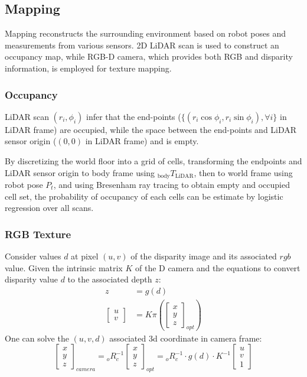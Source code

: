\documentclass[conference]{IEEEtran}
\begin{document}
\subsection{Mapping}
Mapping reconstructs the surrounding environment based on robot poses and measurements from various sensors.
2D LiDAR scan is used to construct an occupancy map, 
while RGB-D camera, which provides both RGB and disparity information,
is employed for texture mapping.

\subsubsection{Occupancy}
LiDAR scan $(r_i, \phi_i)$ infer that 
the end-points ($\{(r_i\cos\phi_i, r_i\sin\phi_i), \forall i\}$ in LiDAR frame) are occupied,
while the space between the end-points and LiDAR sensor origin 
($(0, 0)$ in LiDAR frame) and is empty.

By discretizing the world floor into a grid of cells,
transforming the endpoints and LiDAR sensor origin to body frame using $_{\text{body}}T_{\text{LiDAR}}$, 
then to world frame using robot pose $P_t$,
and using Bresenham ray tracing to obtain empty and occupied cell set,
the probability of occupancy of each cells can be estimate by
logistic regression over all scans.

\subsubsection{RGB Texture}
Consider values $d$ at pixel $(u, v)$ of the disparity image 
and its associated $rgb$ value.
Given the intrinsic matrix $K$ of the D camera and
the equations to convert disparity value $d$ to the associated depth $z$:
$$
\begin{aligned}
    z&=g(d)\\ 
    \left[ \begin{gathered}u\\ v\end{gathered} \right]  &=K\pi \left( \left[ \begin{gathered}x\\ y\\ z\end{gathered} \right]_{opt}  \right)  
\end{aligned}
$$
One can solve the $(u, v, d)$ associated 3d coordinate in camera frame:
$$
\left[ \begin{gathered}x\\ y\\ z\end{gathered} \right]_{camera}
= {}_oR_c^{-1}  \left[ \begin{gathered}x\\ y\\ z\end{gathered} \right]_{opt}  
= {}_oR_c^{-1} \cdot g(d) \cdot K^{-1} \left[ \begin{gathered}u\\ v\\ 1\end{gathered} \right]
$$
\end{document}
